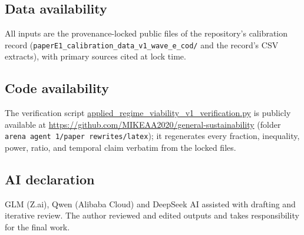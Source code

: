 \documentclass[10pt,twocolumn]{article}
\theoremstyle{plain}
\theoremstyle{remark}
\begin{document}
\subsection*{Data availability}
All inputs are the provenance-locked public files of the repository's
calibration record (\texttt{paperE1\_calibration\_data\_v1\_wave\_e\_cod/}
and the record's CSV extracts), with primary sources cited at lock time.

\subsection*{Code availability}
The verification script
\url{applied_regime_viability_v1_verification.py}
is publicly available at
\url{https://github.com/MIKEAA2020/general-sustainability} (folder
\texttt{arena agent 1/paper rewrites/latex}); it regenerates every
fraction, inequality, power, ratio, and temporal claim verbatim from
the locked files.

\subsection*{AI declaration}
GLM (Z.ai), Qwen (Alibaba Cloud) and DeepSeek AI assisted with drafting
and iterative review. The author reviewed and edited outputs and takes
responsibility for the final work.
\end{document}
